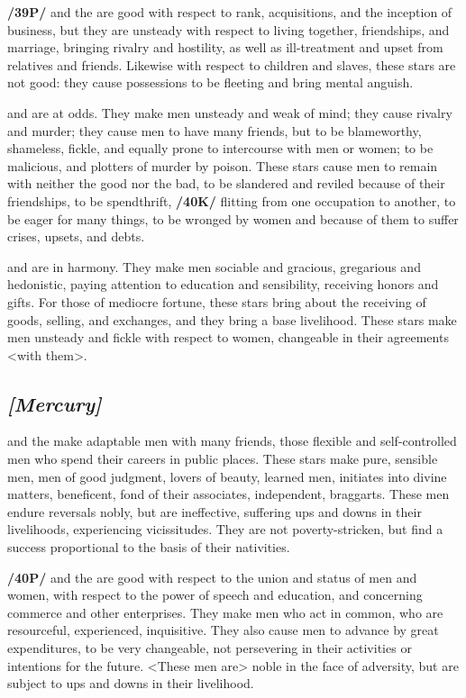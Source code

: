 \textbf{/39P/}\Venus\xspace and the \Moon\xspace are good with respect to rank, acquisitions, and the inception of business,
but they are unsteady with respect to living together, friendships, and marriage, bringing rivalry and hostility, as well as ill-treatment and upset from relatives and friends. Likewise with respect to children and slaves, these stars are not good: they cause possessions to be fleeting and bring mental anguish.

\Venus\xspace and \Mars\xspace are at odds. They make men unsteady and weak of mind; they cause rivalry and murder; they cause men to have many friends, but to be blameworthy, shameless, fickle, and equally prone to intercourse with men or women; to be malicious, and plotters of murder by poison. These stars cause men to remain with neither the good nor the bad, to be slandered and reviled because of their friendships, to
be spendthrift, \textbf{/40K/} flitting from one occupation to another, to be eager for many things, to be wronged by women and because of them to suffer crises, upsets, and debts.

\Venus\xspace and \Mercury\xspace are in harmony. They make men sociable and gracious, gregarious and hedonistic, paying attention to education and sensibility, receiving honors and gifts. For those of mediocre fortune, these stars bring about the receiving of goods, selling, and exchanges, and they bring a base livelihood. These stars make men unsteady and fickle with respect to women, changeable in their agreements <with
them>.

\secbr
\subsection{\textit{[Mercury]}}
\Mercury\xspace and the \Sun\xspace make adaptable men with many friends, those flexible and self-controlled men who spend their careers in public places. These stars make pure, sensible men, men of good judgment, lovers of beauty, learned men, initiates into divine matters, beneficent, fond of their associates, independent, braggarts. These men endure reversals nobly, but are ineffective, suffering ups and downs in their
livelihoods, experiencing vicissitudes. They are not poverty-stricken, but find a success proportional to the basis of their nativities.

\textbf{/40P/}\Mercury\xspace and the \Moon\xspace are good with respect to the union and status of men and women, with respect to the power of speech and education, and concerning commerce and other enterprises. They make men who act in common, who are resourceful, experienced, inquisitive. They also cause men to advance by great expenditures, to be very changeable, not persevering in their activities or intentions for the future.
<These men are> noble in the face of adversity, but are subject to ups and downs in their livelihood.

